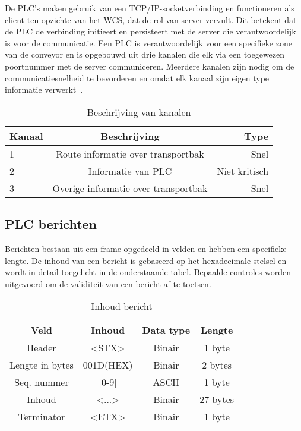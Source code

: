 De PLC's maken gebruik van een TCP/IP-socketverbinding en functioneren als client ten opzichte van het WCS, dat de rol van server vervult. 
Dit betekent dat de PLC de verbinding initieert en persisteert met de server die verantwoordelijk is voor de communicatie.
Een PLC is verantwoordelijk voor een specifieke zone van de conveyor en is opgebouwd uit drie kanalen die elk via een toegewezen poortnummer met de server communiceren. 
Meerdere kanalen zijn nodig om de communicatiesnelheid te bevorderen en omdat elk kanaal zijn eigen type informatie verwerkt~\autocite{Laar2013}.

\begin{table}
    \centering
    \begin{tabular}{lcr}
      \toprule
      \textbf{Kanaal} & \textbf{Beschrijving} & \textbf{Type}                \\
      \midrule
      1                & Route informatie over transportbak          & Snel           \\
      2                & Informatie van PLC                          & Niet kritisch  \\
      3                & Overige informatie over transportbak        & Snel           \\
      \bottomrule
    \end{tabular}
    \caption[Channel assignment]{\label{tab:channel-assignment}Beschrijving van kanalen}
  \end{table}

\subsection{PLC berichten}
Berichten bestaan uit een frame opgedeeld in velden en hebben een specifieke lengte.
De inhoud van een bericht is gebaseerd op het hexadecimale stelsel en wordt in detail toegelicht in de onderstaande tabel.
Bepaalde controles worden uitgevoerd om de validiteit van een bericht af te toetsen. 

\begin{table}[h!]
  \centering 
  \begin{tabular}{|c|c|c|c|}
    \hline
    \textbf{Veld} & \textbf{Inhoud} & \textbf{Data type} & \textbf{Lengte} \\
    \hline 
    Header & <STX> & Binair & 1 byte \\
    \hline 
    Lengte in bytes & 001D(HEX) & Binair & 2 bytes \\
    \hline 
    Seq. nummer &  [0-9] & ASCII & 1 byte  \\
    \hline 
    Inhoud & <...> & Binair & 27 bytes \\
    \hline 
    Terminator & <ETX> & Binair & 1 byte \\
    \hline
  \end{tabular}
  \caption[Message content]{\label{tab:message-content}Inhoud bericht}
\end{table}

